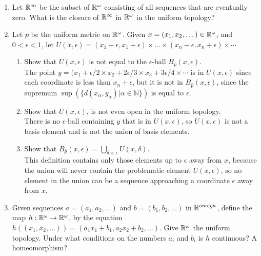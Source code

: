 \documentclass[12pt,letterpaper]{article}
\begin{document}
\begin{enumerate}
\begin{enumerate}
  \end{enumerate}
  \item Let $\mathbb{R}^\infty$ be the subset of $\mathbb{R}^\omega$ consisting of all sequences that are eventually zero. What is the closure of $\mathbb{R}^\infty$ in $\mathbb{R}^\omega$ in the uniform topology?
  \item Let $\bar{p}$ be the uniform metric on $\mathbb{R}^\omega$. Given $x = (x_1, x_2, \dots) \in \mathbb{R}^\omega$, and $0<\epsilon < 1$, let $U(x,\epsilon) = (x_1 - \epsilon, x_1+\epsilon) \times \dots \times (x_n-\epsilon, x_n+\epsilon)\times \cdots$
  \begin{enumerate}
    \item Show that $U(x,\epsilon)$ is not equal to the $\epsilon$-ball $B_{\bar{p}}(x,\epsilon)$. \\
    The point $y=(x_1+\epsilon/2 \times x_2+2\epsilon/3 \times x_3+3\epsilon/4\times\cdots$ is in $U(x,\epsilon)$ since each coordinate is less than $x_n+\epsilon$, but it is not in $B_{\bar{p}}(x,\epsilon)$, since the supremum $\sup(\{\bar{d}(x_\alpha, y_\alpha) | \alpha \in \mathbb{N}\})$ is equal to $\epsilon$.
    \item Show that $U(x,\epsilon)$, is not even open in the uniform topology. \\
    There is no $\epsilon$-ball containing $y$ that is in $U(x,\epsilon)$, so $U(x,\epsilon)$ is not a basis element and is not the union of basis elements.
    \item Show that $B_{\bar{p}}(x,\epsilon) = \displaystyle\bigcup_{\delta<\epsilon}U(x,\delta)$. \\
    This definition contains only those elements up to $\epsilon$ away from $x$, because the union will never contain the problematic element $U(x,\epsilon)$, so no element in the union can be a sequence approaching a coordinate $\epsilon$ away from $x$.
  \end{enumerate}
  \item Given sequences $a=(a_1,a_2,\dots)$ and $b=(b_1,b_2,\dots)$ in $\mathbb{R}^{omega}$, define the map $h: \mathbb{R}^{\omega} \rightarrow \mathbb{R}^{\omega}$, by the equation $h((x_1,x_2,\dots)) = (a_1x_1+b_1,a_2x_2+b_2,\dots)$. Give $\mathbb{R}^{\omega}$ the uniform topology. Under what conditions on the numbers $a_i$ and $b_i$ is $h$ continuous? A homeomorphism? \\

\end{enumerate}
\end{document}
